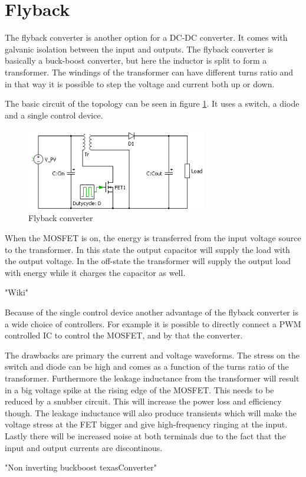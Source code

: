 \section{Flyback}

The flyback converter is another option for a DC-DC converter. It comes with galvanic isolation between the input and outputs. The flyback converter is basically a buck-boost converter, but here the inductor is split to form a transformer. The windings of the transformer can have different turns ratio and in that way it is possible to step the voltage and current both up or down. 

The basic circuit of the topology can be seen in figure \ref{Flyback_SCHEMATIC}. It uses a switch, a diode and a single control device.    

\begin{figure}[htbp]
	\begin{center}
	\includegraphics[width=0.7\textwidth]{../Pictures/flyback_schem.png}
	\caption{Flyback converter}
	\label{Flyback_SCHEMATIC}
	\end{center}
\end{figure}

When the MOSFET is on, the energy is transferred from the input voltage source to the transformer. In this state the output capacitor will supply the load with the output voltage. In the off-state the transformer will supply the output load with energy while it charges the capacitor as well.

"Wiki" 

Because of the single control device another advantage of the flyback converter is a wide choice of controllers. For example it is possible to directly connect a PWM controlled IC to control the MOSFET, and by that the converter. 

The drawbacks are primary the current and voltage waveforms. The stress on the switch and diode can be high and comes as a function of the turns ratio of the transformer. Furthermore the leakage inductance from the transformer will result in a big voltage spike at the rising edge of the MOSFET. This needs to be reduced by a snubber circuit. This will increase the power loss and efficiency though. The leakage inductance will also produce transients which will make the voltage stress at the FET bigger and give high-frequency ringing at the input. Lastly there will be increased noise at both terminals due to the fact that the input and output currents are discontinous. 

"Non inverting buckboost texasConverter"
